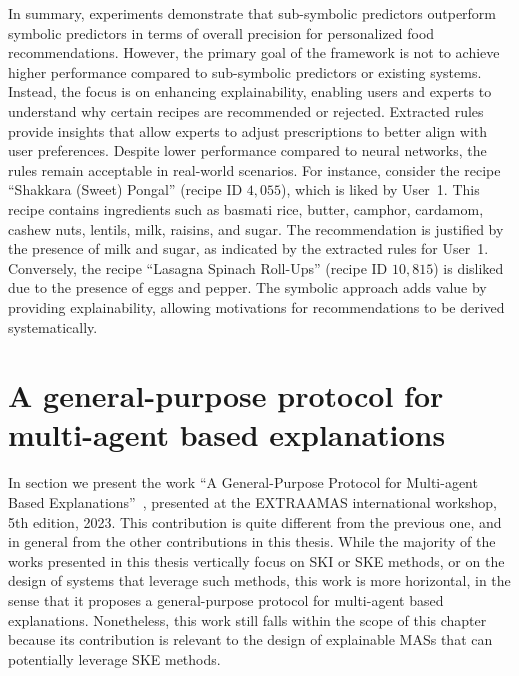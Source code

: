 In summary, experiments demonstrate that sub-symbolic predictors outperform symbolic predictors in terms of overall precision for personalized food recommendations.
%
However, the primary goal of the framework is not to achieve higher performance compared to sub-symbolic predictors or existing systems.
%
Instead, the focus is on enhancing explainability, enabling users and experts to understand why certain recipes are recommended or rejected.
%
Extracted rules provide insights that allow experts to adjust prescriptions to better align with user preferences.
%
Despite lower performance compared to neural networks, the rules remain acceptable in real-world scenarios.
%
For instance, consider the recipe ``Shakkara (Sweet) Pongal'' (recipe ID \(4,055\)), which is liked by User~1.
%
This recipe contains ingredients such as basmati rice, butter, camphor, cardamom, cashew nuts, lentils, milk, raisins, and sugar.
%
The recommendation is justified by the presence of milk and sugar, as indicated by the extracted rules for User~1.
%
Conversely, the recipe ``Lasagna Spinach Roll-Ups'' (recipe ID \(10,815\)) is disliked due to the presence of eggs and pepper.
%
The symbolic approach adds value by providing explainability, allowing motivations for recommendations to be derived systematically.



\section{A general-purpose protocol for multi-agent based explanations}\label{sec:a-general-purpose-protocol-for-multi-agent-based-explanations}
%
In section we present the work ``A General-Purpose Protocol for Multi-agent Based Explanations''~\cite{DBLP:conf/extraamas/CiattoMBAO23}, presented at the \gls{EXTRAAMAS} international workshop, 5th edition, 2023.
%
This contribution is quite different from the previous one, and in general from the other contributions in this thesis.
%
While the majority of the works presented in this thesis vertically focus on \gls{SKI} or \gls{SKE} methods, or on the design of systems that leverage such methods, this work is more horizontal, in the sense that it proposes a general-purpose protocol for multi-agent based explanations.
%
Nonetheless, this work still falls within the scope of this chapter because its contribution is relevant to the design of explainable \glspl{MAS} that can potentially leverage \gls{SKE} methods.


